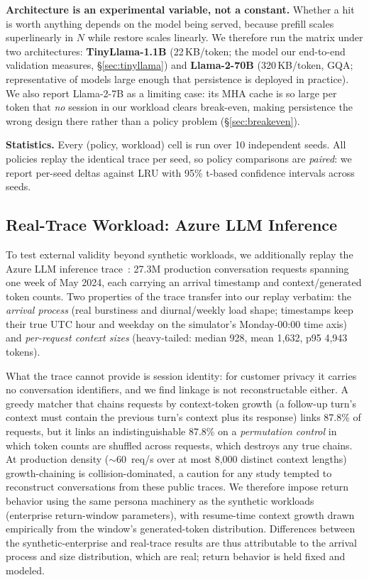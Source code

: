 \documentclass[letterpaper,twocolumn,10pt]{article}
\begin{document}
\textbf{Architecture is an experimental variable, not a constant.} Whether a hit is worth anything depends on the model being served, because prefill scales superlinearly in $N$ while restore scales linearly. We therefore run the matrix under two architectures: \textbf{TinyLlama-1.1B} (22\,KB/token; the model our end-to-end validation measures, \S\ref{sec:tinyllama}) and \textbf{Llama-2-70B} (320\,KB/token, GQA; representative of models large enough that persistence is deployed in practice). We also report Llama-2-7B as a limiting case: its MHA cache is so large per token that \emph{no} session in our workload clears break-even, making persistence the wrong design there rather than a policy problem (\S\ref{sec:breakeven}).

\textbf{Statistics.} Every (policy, workload) cell is run over 10 independent seeds. All policies replay the identical trace per seed, so policy comparisons are \emph{paired}: we report per-seed deltas against LRU with 95\% t-based confidence intervals across seeds.

\subsection{Real-Trace Workload: Azure LLM Inference}
\label{sec:realtrace}

To test external validity beyond synthetic workloads, we additionally replay the Azure LLM inference trace~\cite{azurepublicdataset,stojkovic2025dynamollm}: 27.3M production conversation requests spanning one week of May 2024, each carrying an arrival timestamp and context/generated token counts. Two properties of the trace transfer into our replay verbatim: the \emph{arrival process} (real burstiness and diurnal/weekly load shape; timestamps keep their true UTC hour and weekday on the simulator's Monday-00:00 time axis) and \emph{per-request context sizes} (heavy-tailed: median 928, mean 1{,}632, p95 4{,}943 tokens).

What the trace cannot provide is session identity: for customer privacy it carries no conversation identifiers, and we find linkage is not reconstructable either. A greedy matcher that chains requests by context-token growth (a follow-up turn's context must contain the previous turn's context plus its response) links 87.8\% of requests, but it links an indistinguishable 87.8\% on a \emph{permutation control} in which token counts are shuffled across requests, which destroys any true chains. At production density (${\sim}60$~req/s over at most 8{,}000 distinct context lengths) growth-chaining is collision-dominated, a caution for any study tempted to reconstruct conversations from these public traces. We therefore impose return behavior using the same persona machinery as the synthetic workloads (enterprise return-window parameters), with resume-time context growth drawn empirically from the window's generated-token distribution. Differences between the synthetic-enterprise and real-trace results are thus attributable to the arrival process and size distribution, which are real; return behavior is held fixed and modeled.
\end{document}
